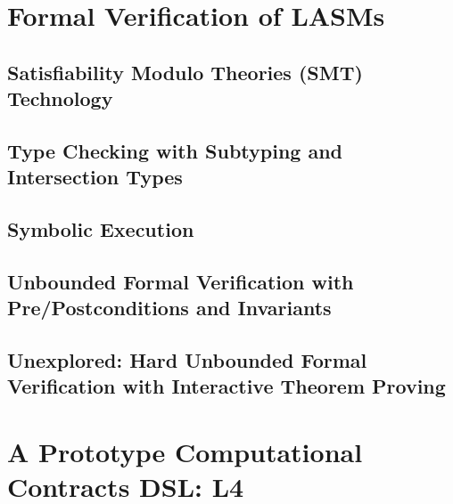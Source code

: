 \documentclass[12pt]{article}
\newcommand{\lasms}{{\sf LASM}s\xspace}
\begin{document}
\section{Formal Verification of \lasms} \label{static}

\subsection{Satisfiability Modulo Theories (SMT) Technology}

\subsection{Type Checking with Subtyping and Intersection Types}

\subsection{Symbolic Execution}

\subsection{Unbounded Formal Verification with Pre/Postconditions and Invariants}

\subsection{Unexplored: Hard Unbounded Formal Verification with Interactive Theorem Proving}

\section{A Prototype Computational Contracts DSL: L4}

 
\end{document}
